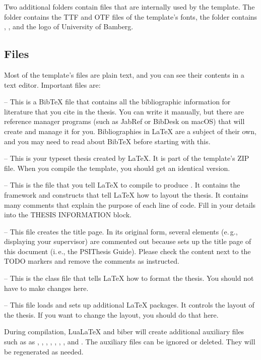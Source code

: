 Two additional folders contain files that are internally used by the template. The folder  contains the TTF and OTF files of the template's fonts, the folder  contains , , and the logo of University of Bamberg.

\subsection{Files}
\label{sec:files}

Most of the template's files are plain text, and you can see their contents in a text editor. Important files are:

 -- This is a BibTeX file that contains all the bibliographic information for literature that you cite in the thesis.
You can write it manually, but there are reference manager programs (such as JabRef or BibDesk on macOS) that will create and manage it for you. Bibliographies in LaTeX are a subject of their own, and you may need to read about BibTeX before starting with this.

 -- This is your typeset thesis created by LaTeX. It is part of the template's ZIP file. When you compile the template, you should get an identical version.

 -- This is the file that you tell LaTeX to compile to produce .
It contains the framework and constructs that tell LaTeX how to layout the thesis. It contains many comments that explain the purpose of each line of code. Fill in your details into the THESIS INFORMATION block.

 -- This file creates the title page. In its original form, several elements (e.\,g., displaying your supervisor) are commented out because  sets up the title page of this document (i.\,e., the PSIThesis Guide). Please check the content next to the TODO markers and remove the comments as instructed.

 -- This is the class file that tells LaTeX how to format the thesis. You should not have to make changes here.

 -- This file loads and sets up additional LaTeX packages.
It controls the layout of the thesis. If you want to change the layout, you should do that here.

During compilation, LuaLaTeX and biber will create additional auxiliary files such as as
, , , ,
, , , and .
The auxiliary files can be ignored or deleted. They will be regenerated  as needed.


